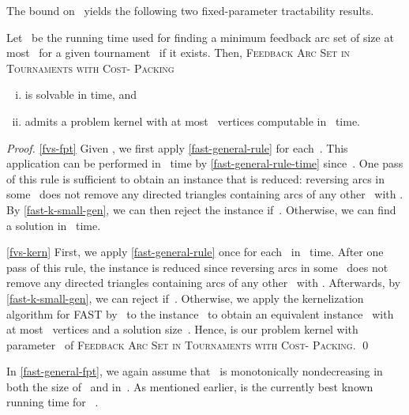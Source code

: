 \documentclass[envcountsame,numbook,smallextended]{svjour3}
\numberwithin{equation}{section}
\numberwithin{figure}{section}
\newcommand{\FASTGP}{\textsc{Feedback Arc Set in Tournaments with  Cost- Packing}}
\begin{document}
\noindent The bound on~ yields the following two fixed-parameter tractability results.

\begin{theorem}\label{fast-general-fpt}
  Let ~be the running time used for finding a minimum feedback arc set of size at most~ for a given tournament~ if it exists.  Then, \FASTGP{}
  \begin{enumerate}[(i)]
  \item\label{fvs-fpt} is solvable in  time, and
  \item\label{fvs-kern} admits a problem kernel with at most~ vertices computable in~ time.
  \end{enumerate}
\end{theorem}

\begin{proof}
  \eqref{fvs-fpt} Given , we first apply \cref{fast-general-rule} for each~.  This application can be performed in~ time by \cref{fast-general-rule-time} since~.
  One pass of this rule is sufficient
  to obtain an instance that is reduced:
  reversing arcs in some~
  does not remove any directed triangles
  containing arcs of any other~
  with .
  By \cref{fast-k-small-gen}, we can then reject the instance if~.  Otherwise, we can find a solution in~ time.

  \eqref{fvs-kern}
  First, we apply \cref{fast-general-rule}
  once for each~ in
  ~time.
  After one pass of this rule,
  the instance is reduced
  since reversing arcs in some~
  does not remove any directed triangles
  containing arcs of any other~
  with .
  Afterwards, by \cref{fast-k-small-gen}, we can reject if~.  Otherwise, we apply the kernelization algorithm for \textsc{FAST} by~\citet{PPT16} to the instance~ to obtain an equivalent instance~ with at most~ vertices and a solution size~. 
  Hence,
   is our problem kernel 
  with parameter~ of \FASTGP{}.  \qed\end{proof}

\noindent In \cref{fast-general-fpt}, we again assume that ~is monotonically nondecreasing in both the size of~ and in~.  As mentioned earlier,  is the currently best known running time for ~\cite{KS10}.

\end{document}
